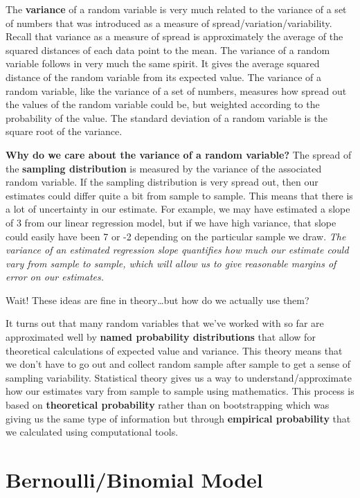 \documentclass[
]{book}
\begin{document}
The \textbf{variance} of a random variable is very much related to the variance of a set of numbers that was introduced as a measure of spread/variation/variability. Recall that variance as a measure of spread is approximately the average of the squared distances of each data point to the mean. The variance of a random variable follows in very much the same spirit. It gives the average squared distance of the random variable from its expected value. The variance of a random variable, like the variance of a set of numbers, measures how spread out the values of the random variable could be, but weighted according to the probability of the value. The standard deviation of a random variable is the square root of the variance.

\textbf{Why do we care about the variance of a random variable?} The spread of the \textbf{sampling distribution} is measured by the variance of the associated random variable. If the sampling distribution is very spread out, then our estimates could differ quite a bit from sample to sample. This means that there is a lot of uncertainty in our estimate. For example, we may have estimated a slope of 3 from our linear regression model, but if we have high variance, that slope could easily have been 7 or -2 depending on the particular sample we draw. \emph{The variance of an estimated regression slope quantifies how much our estimate could vary from sample to sample, which will allow us to give reasonable margins of error on our estimates.}

Wait! These ideas are fine in theory\ldots but how do we actually use them?

It turns out that many random variables that we've worked with so far are approximated well by \textbf{named probability distributions} that allow for theoretical calculations of expected value and variance. This theory means that we don't have to go out and collect random sample after sample to get a sense of sampling variability. Statistical theory gives us a way to understand/approximate how our estimates vary from sample to sample using mathematics. This process is based on \textbf{theoretical probability} rather than on bootstrapping which was giving us the same type of information but through \textbf{empirical probability} that we calculated using computational tools.

\hypertarget{bernoullibinomial-model}{%
\section{Bernoulli/Binomial Model}\label{bernoullibinomial-model}}
\end{document}
